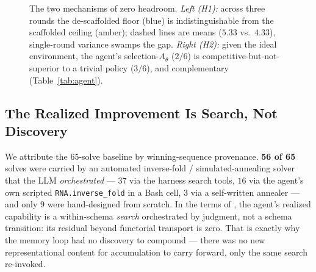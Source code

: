 \documentclass[11pt]{article}
\newcommand{\Ath}{A_{\theta}}
\begin{document}
\begin{figure}[t]\centering
{}
\caption{The two mechanisms of zero headroom. \emph{Left (H1):} across three rounds the de-scaffolded
floor (blue) is indistinguishable from the scaffolded ceiling (amber); dashed lines are means
($5.33$ vs.\ $4.33$), single-round variance swamps the gap. \emph{Right (H2):} given the ideal
environment, the agent's selection-$\Ath$ ($2/6$) is competitive-but-not-superior to a trivial policy
($3/6$), and complementary (Table~\ref{tab:agent}).}
\label{fig:mech}
\end{figure}

\subsection{The Realized Improvement Is Search, Not Discovery}\label{sec:search}
We attribute the $65$-solve baseline by winning-sequence provenance. \textbf{56 of 65} solves were
carried by an automated inverse-fold / simulated-annealing solver that the LLM \emph{orchestrated} ---
$37$ via the harness search tools, $16$ via the agent's own scripted \texttt{RNA.inverse\_fold} in a
Bash cell, $3$ via a self-written annealer --- and only $9$ were hand-designed from
scratch.%
In the terms of \citet{wangbuehler2026}, the agent's realized capability is a within-schema \emph{search}
orchestrated by judgment, not a schema transition: its residual beyond functorial transport is zero.
That is exactly why the memory loop had no discovery to compound --- there was no new representational
content for accumulation to carry forward, only the same search re-invoked.
\end{document}
